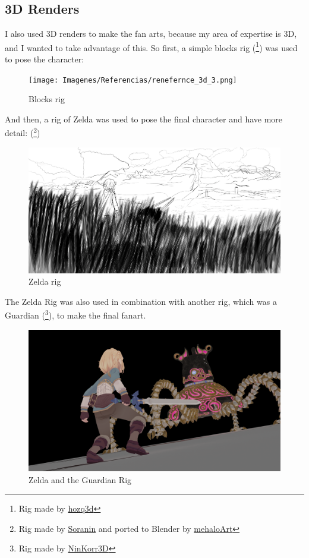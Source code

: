 \documentclass{cup-pan}
\begin{document}
    \subsection*{3D Renders}
    I also used 3D renders to make the fan arts, because my area of expertise is 3D, and I wanted to take advantage of this.
    So first, a simple blocks rig
    (\footnote{Rig made by 
    \href{https://hozq3d.gumroad.com/l/Blocks}{hozq3d}}) 
    was used to pose the character: 
    \begin{figure}[H]
        \texttt{[image: Imagenes/Referencias/renefernce\_3d\_3.png]}
        \caption{Blocks rig}
    \end{figure}

    And then, a rig of Zelda was used to pose the final character and have more detail:    
    (\footnote{Rig made by 
    \href{https://www.youtube.com/watch?v=1EUcGBMVRbA}{Soranin} and ported to Blender by  
    \href{https://twitter.com/mehaloArt/status/1528197222751383552?s=20}{mehaloArt}})

    \begin{figure}[H]
        \includegraphics[width=\textwidth]{Imagenes/Referencias/ref_zelda.png}
        \caption{Zelda rig}
    \end{figure}

    The Zelda Rig was also used in combination with another rig, which was a Guardian 
    (\footnote{Rig made by 
        \href{https://sketchfab.com/3d-models/guardian-zelda-botw-fan-art-990a6a9434c849329360ea1ef9078895}{NinKorr3D}}), to make the final fanart.
    \begin{figure}[H]
        \includegraphics[width=\textwidth]{Imagenes/Referencias/referencia art 2.png}
        \caption{Zelda and the Guardian Rig}
    \end{figure}
\end{document}
